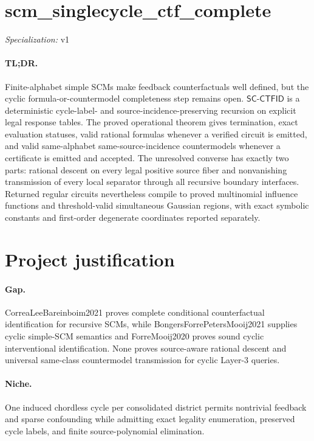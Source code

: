 \documentclass{article}
\begin{document}
\sloppy

\section*{scm\_\allowbreak{}singlecycle\_\allowbreak{}ctf\_\allowbreak{}complete}

\noindent\textit{Specialization:} v1\par

\paragraph{TL;DR.} Finite-alphabet simple SCMs make feedback counterfactuals well defined, but the cyclic formula-or-countermodel completeness step remains open.  \(\mathsf{SC\mbox{-}CTFID}\) is a deterministic cycle-label- and source-incidence-preserving recursion on explicit legal response tables.  The proved operational theorem gives termination, exact evaluation statuses, valid rational formulas whenever a verified circuit is emitted, and valid same-alphabet same-source-incidence countermodels whenever a certificate is emitted and accepted.  The unresolved converse has exactly two parts: rational descent on every legal positive source fiber and nonvanishing transmission of every local separator through all recursive boundary interfaces.  Returned regular circuits nevertheless compile to proved multinomial influence functions and threshold-valid simultaneous Gaussian regions, with exact symbolic constants and first-order degenerate coordinates reported separately.

\section{Project justification}

\paragraph{Gap.} CorreaLeeBareinboim2021 proves complete conditional counterfactual identification for recursive SCMs, while BongersForrePetersMooij2021 supplies cyclic simple-SCM semantics and ForreMooij2020 proves sound cyclic interventional identification.  None proves source-aware rational descent and universal same-class countermodel transmission for cyclic Layer-3 queries.

\paragraph{Niche.} One induced chordless cycle per consolidated district permits nontrivial feedback and sparse confounding while admitting exact legality enumeration, preserved cycle labels, and finite source-polynomial elimination.
\end{document}

